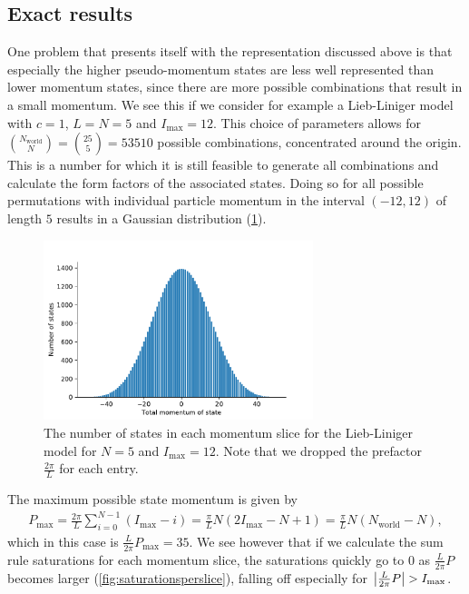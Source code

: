 \documentclass[11pt, a4paper]{report} %
\begin{document}
\subsection{Exact results}\label{sec:exact}

One problem that presents itself with the representation discussed above is that especially the higher pseudo-momentum states are less well represented than lower momentum states, since there are more possible combinations that result in a small momentum.
We see this if we consider for example a Lieb-Liniger model with \(c=1\), \(L=N=5\) and \(I_{\max} =12\).
This choice of parameters allows for \(\binom{N_{\mathrm{world}}}{N}=\binom{25}{5}=53510\) possible combinations, concentrated around the origin.
This is a number for which it is still feasible to generate all combinations and calculate the form factors of the associated states.
Doing so for all possible permutations with individual particle momentum in the interval \((-12, 12)\) of length \(5\) results in a Gaussian distribution (\cref{fig:no_of_states}).
\begin{figure}[tb]
  \centering
  \includegraphics[width=0.7\textwidth]{no_of_states}
  \caption{The number of states in each momentum slice for the Lieb-Liniger model for \(N=5\) and \(I_{\max}=12\). Note that we dropped the prefactor \(\frac{2\pi}{L}\) for each entry.}
  \label{fig:no_of_states}
\end{figure}
The maximum possible state momentum is given by
\begin{align}
  \label{eq:50}
  P_{\max} = \frac{2\pi}{L}\sum_{i=0}^{N-1}(I_{\max}-i) = \frac{\pi}{L}N (2 I_{\max} -N +1) = \frac{\pi}{L}N (N_{\mathrm{world}} -N),
\end{align}
which in this case is \(\frac{L}{2\pi}P_{\max} = 35\).
We see however that if we calculate the sum rule saturations for each momentum slice, the saturations quickly go to 0 as \(\frac{L}{2\pi}P\) becomes larger (\cref{fig:saturationsperslice}), falling off especially for \(\abs{\frac{L}{2\pi}P}>I_{\max}\).
\end{document}

